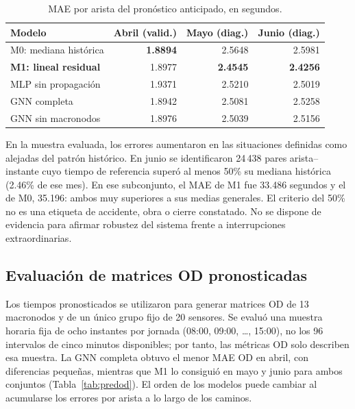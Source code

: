 \documentclass[letterpaper,11pt]{article}
\begin{document}
\begin{table}[htbp]\centering\small
\caption{MAE por arista del pronóstico anticipado, en segundos.}\label{tab:pronostico}
\begin{tabular}{@{}lrrr@{}}\toprule
Modelo & Abril (valid.) & Mayo (diag.) & Junio (diag.) \\ \midrule
M0: mediana histórica & \textbf{1.8894} & 2.5648 & 2.5981 \\
\textbf{M1: lineal residual} & 1.8977 & \textbf{2.4545} & \textbf{2.4256} \\
MLP sin propagación & 1.9371 & 2.5210 & 2.5019 \\
GNN completa & 1.8942 & 2.5081 & 2.5258 \\
GNN sin macronodos & 1.8976 & 2.5039 & 2.5156 \\ \bottomrule
\end{tabular}
\end{table}

En la muestra evaluada, los errores aumentaron en las situaciones definidas como alejadas del patrón histórico. En junio se identificaron 24\,438 pares arista--instante cuyo tiempo de referencia superó al menos 50\% su mediana histórica (2.46\% de ese mes). En ese subconjunto, el MAE de M1 fue 33.486 segundos y el de M0, 35.196: ambos muy superiores a sus medias generales. El criterio del 50\% no es una etiqueta de accidente, obra o cierre constatado. No se dispone de evidencia para afirmar robustez del sistema frente a interrupciones extraordinarias.

\subsection{Evaluación de matrices OD pronosticadas}
Los tiempos pronosticados se utilizaron para generar matrices OD de 13 macronodos y de un único grupo fijo de 20 sensores. Se evaluó una muestra horaria fija de ocho instantes por jornada (08:00, 09:00, \ldots, 15:00), no los 96 intervalos de cinco minutos disponibles; por tanto, las métricas OD solo describen esa muestra. La GNN completa obtuvo el menor MAE OD en abril, con diferencias pequeñas, mientras que M1 lo consiguió en mayo y junio para ambos conjuntos (Tabla~\ref{tab:predod}). El orden de los modelos puede cambiar al acumularse los errores por arista a lo largo de los caminos.
\end{document}

